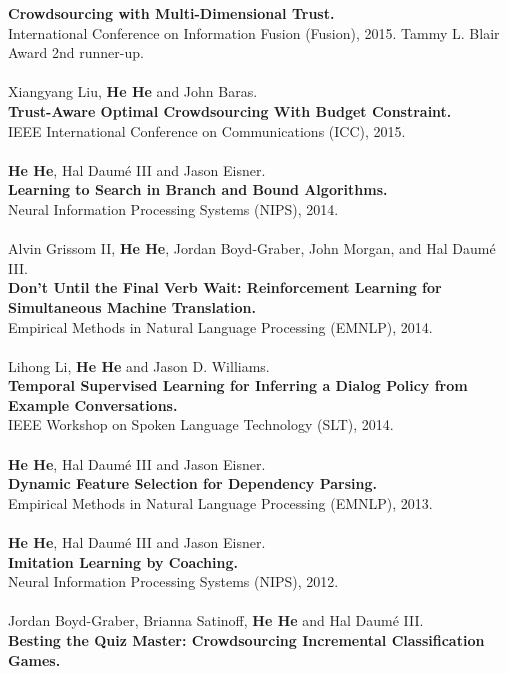 \documentclass[a4paper,11pt]{article}
\begin{document}
{\bf Crowdsourcing with Multi-Dimensional Trust.}\\
International Conference on Information Fusion (Fusion), 2015.
Tammy L. Blair Award 2nd runner-up.\\
\\
Xiangyang Liu, {\bf He He} and John Baras.\\
{\bf Trust-Aware Optimal Crowdsourcing With Budget Constraint.}\\
IEEE International Conference on Communications (ICC), 2015.\\
\\
{\bf He He}, Hal Daum\'e III and Jason Eisner. \\
{\bf Learning to Search in Branch and Bound Algorithms.}\\
Neural Information Processing Systems (NIPS), 2014.\\
\\
Alvin Grissom II, {\bf He He}, Jordan Boyd-Graber, John Morgan, and Hal Daum\'e III. \\
{\bf Don't Until the Final Verb Wait: Reinforcement Learning for Simultaneous Machine Translation.}\\
Empirical Methods in Natural Language Processing (EMNLP), 2014.\\
\\
Lihong Li, {\bf He He} and Jason D. Williams. \\
{\bf Temporal Supervised Learning for Inferring a Dialog Policy from Example Conversations.}\\
IEEE Workshop on Spoken Language Technology (SLT), 2014.\\
\\
{\bf He He}, Hal Daum\'e III and Jason Eisner.\\
{\bf Dynamic Feature Selection for Dependency Parsing.}\\ 
Empirical Methods in Natural Language Processing (EMNLP), 2013.\\
\\
{\bf He He}, Hal Daum\'e III and Jason Eisner.\\
{\bf Imitation Learning by Coaching.}\\ 
Neural Information Processing Systems (NIPS), 2012.\\
\\
Jordan Boyd-Graber, Brianna Satinoff, {\bf He He} and Hal Daum\'e III.\\
{\bf Besting the Quiz Master: Crowdsourcing Incremental Classification Games.}\\
\end{document}
